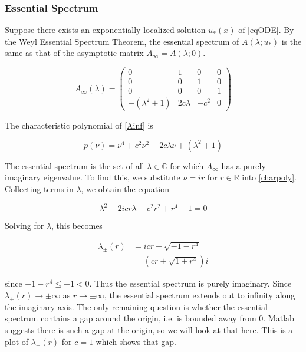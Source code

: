 \documentclass[12pt]{article}
\def\R{{\mathbb R}}
\def\C{{\mathbb C}}
\begin{document}
\subsubsection{Essential Spectrum}

Suppose there exists an exponentially localized solution $u_*(x)$ of \eqref{eqODE}. By the Weyl Essential Spectrum Theorem, the essential spectrum of $A(\lambda; u_*)$ is the same as that of the asymptotic matrix $A_\infty = A(\lambda; 0)$.

\begin{equation}\label{Ainf}
A_\infty(\lambda) = \begin{pmatrix}
0 & 1 & 0 & 0 \\ 
0 & 0 & 1 & 0 \\
0 & 0 & 0 & 1 \\
-(\lambda^2 + 1) & 2 c \lambda & -c^2 & 0 
\end{pmatrix}
\end{equation}

The characteristic polynomial of \eqref{Ainf} is

\begin{equation}\label{charpoly}
p(\nu) = \nu^4 + c^2 \nu^2 - 2 c \lambda \nu + (\lambda^2 + 1) 
\end{equation} 

The essential spectrum is the set of all $\lambda \in \C$ for which $A_\infty$ has a purely imaginary eigenvalue. To find this, we substitute $\nu = i r$ for $r \in \R$ into \eqref{charpoly}. Collecting terms in $\lambda$, we obtain the equation

\begin{equation}\label{fredholmborder}
\lambda^2 - 2 i c r \lambda - c^2 r^2  + r^4 + 1 = 0 
\end{equation} 

Solving for $\lambda$, this becomes

\begin{align*}
\lambda_\pm(r) &= i c r \pm \sqrt{-1 - r^4} \\
&= \left( c r \pm \sqrt{1 + r^4} \right) i
\end{align*}

since $-1 - r^4 \leq -1 < 0$. Thus the essential spectrum is purely imaginary. Since $\lambda_\pm(r) \rightarrow \pm \infty$ as $r \rightarrow \pm \infty$, the essential spectrum extends out to infinity along the imaginary axis. The only remaining question is whether the essential spectrum contains a gap around the origin, i.e. is bounded away from 0. Matlab suggests there is such a gap at the origin, so we will look at that here. This is a plot of $\lambda_\pm(r)$ for $c = 1$ which shows that gap.
\end{document}
